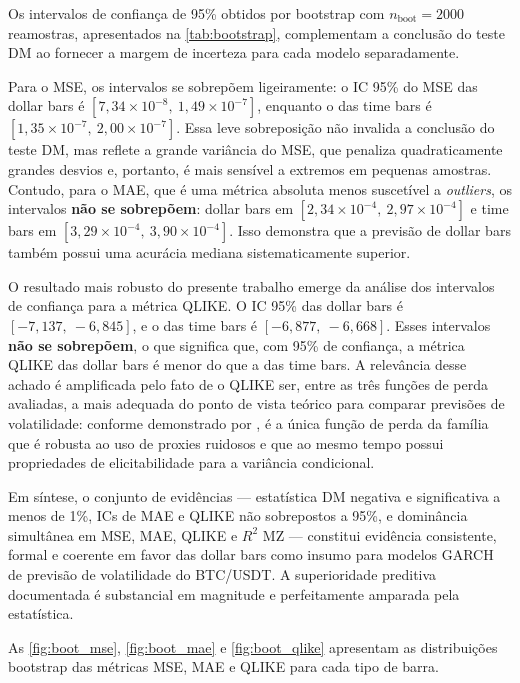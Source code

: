 Os intervalos de confiança de 95\% obtidos por bootstrap com $n_{\text{boot}} = 2000$
reamostras, apresentados na \autoref{tab:bootstrap}, complementam a
conclusão do teste DM ao fornecer a margem de incerteza para cada modelo
separadamente.

Para o MSE, os intervalos se sobrepõem ligeiramente: o IC 95\% do MSE das dollar bars é
$[7{,}34 \times 10^{-8},\ 1{,}49 \times 10^{-7}]$, enquanto o das time bars é
$[1{,}35 \times 10^{-7},\ 2{,}00 \times 10^{-7}]$. Essa leve sobreposição não
invalida a conclusão do teste DM, mas reflete a grande variância do MSE, que
penaliza quadraticamente grandes desvios e, portanto, é mais sensível a extremos
em pequenas amostras. Contudo, para o MAE, que é uma métrica absoluta menos
suscetível a \textit{outliers}, os intervalos \textbf{não se sobrepõem}: dollar bars em
$[2{,}34 \times 10^{-4},\ 2{,}97 \times 10^{-4}]$ e time bars em
$[3{,}29 \times 10^{-4},\ 3{,}90 \times 10^{-4}]$. Isso demonstra que a previsão de dollar bars
também possui uma acurácia mediana sistematicamente superior.

O resultado mais robusto do presente trabalho emerge da análise dos intervalos de
confiança para a métrica QLIKE. O IC 95\% das dollar bars é $[-7{,}137,\ -6{,}845]$,
e o das time bars é $[-6{,}877,\ -6{,}668]$. Esses intervalos \textbf{não se sobrepõem},
o que significa que, com 95\% de confiança, a métrica QLIKE das dollar bars é menor do
que a das time bars. A relevância desse achado é amplificada pelo fato de o QLIKE ser,
entre as três funções de perda avaliadas, a mais adequada do ponto de vista teórico para
comparar previsões de volatilidade: conforme demonstrado por , é a
única função de perda da família que é robusta ao uso de proxies ruidosos e que ao mesmo
tempo possui propriedades de elicitabilidade para a variância condicional.

Em síntese, o conjunto de evidências — estatística DM negativa e significativa a menos de 1\%,
ICs de MAE e QLIKE não sobrepostos a 95\%, e dominância simultânea em MSE, MAE,
QLIKE e $R^2$ MZ — constitui evidência consistente, formal e coerente em favor das dollar bars
como insumo para modelos GARCH de previsão de volatilidade do BTC/USDT. A superioridade
preditiva documentada é substancial em magnitude e perfeitamente amparada pela estatística.

As \autoref{fig:boot_mse}, \autoref{fig:boot_mae} e \autoref{fig:boot_qlike} apresentam as distribuições
bootstrap das métricas MSE, MAE e QLIKE para cada tipo de barra.


